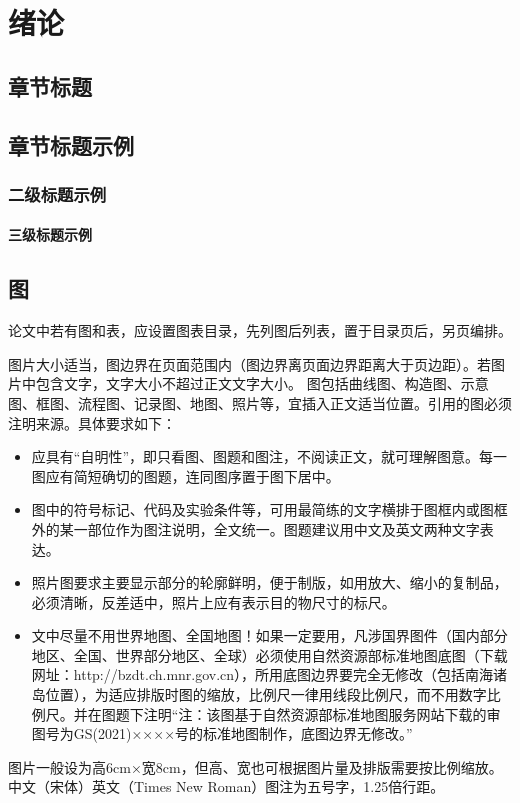\chapter{绪论}\label{chap:introduction}

\section{章节标题}
\section{章节标题示例}
\subsection{二级标题示例}
\subsubsection{三级标题示例}

\section{图}
论文中若有图和表，应设置图表目录，先列图后列表，置于目录页后，另页编排。

图片大小适当，图边界在页面范围内（图边界离页面边界距离大于页边距）。若图片中包含文字，文字大小不超过正文文字大小。
图包括曲线图、构造图、示意图、框图、流程图、记录图、地图、照片等，宜插入正文适当位置。引用的图必须注明来源。具体要求如下：

\begin{itemize}
    \item 应具有“自明性”，即只看图、图题和图注，不阅读正文，就可理解图意。每一图应有简短确切的图题，连同图序置于图下居中。
    \item 图中的符号标记、代码及实验条件等，可用最简练的文字横排于图框内或图框外的某一部位作为图注说明，全文统一。图题建议用中文及英文两种文字表达。
    \item 照片图要求主要显示部分的轮廓鲜明，便于制版，如用放大、缩小的复制品，必须清晰，反差适中，照片上应有表示目的物尺寸的标尺。
    \item 文中尽量不用世界地图、全国地图！如果一定要用，凡涉国界图件（国内部分地区、全国、世界部分地区、全球）必须使用自然资源部标准地图底图（下载网址：http://bzdt.ch.mnr.gov.cn），所用底图边界要完全无修改（包括南海诸岛位置），为适应排版时图的缩放，比例尺一律用线段比例尺，而不用数字比例尺。并在图题下注明“注：该图基于自然资源部标准地图服务网站下载的审图号为GS(2021)××××号的标准地图制作，底图边界无修改。”
\end{itemize}
图片一般设为高6cm×宽8cm，但高、宽也可根据图片量及排版需要按比例缩放。中文（宋体）英文（Times New Roman）图注为五号字，1.25倍行距。

